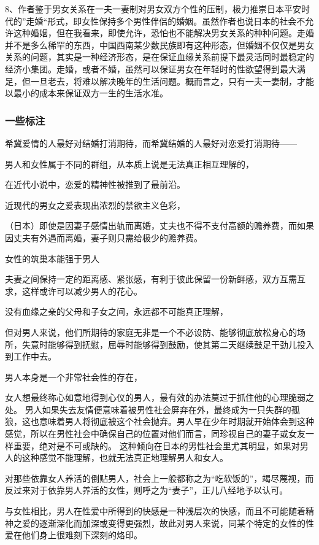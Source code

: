 8、作者鉴于男女关系在一夫一妻制对男女双方个性的压制，极力推崇日本平安时代的”走婚“形式，即女性保持多个男性伴侣的婚姻。虽然作者也说日本的社会不允许这种婚姻，但在我看来，即使允许，恐怕也不能解决男女关系的种种问题。走婚并不是多么稀罕的东西，中国西南某少数民族即有这种形态，但婚姻不仅仅是男女关系的问题，其实是一种经济形态，是在保证血缘关系前提下最灵活同时最稳定的经济小集团。走婚，或者不婚，虽然可以保证男女在年轻时的性欲望得到最大满足，但一旦老去，将难以解决晚年的生活问题。概而言之，只有一夫一妻制，才能以最小的成本来保证双方一生的生活水准。

\subsubsection{一些标注}

希冀爱情的人最好对结婚打消期待，而希冀结婚的人最好对恋爱打消期待——

男人和女性属于不同的群组，从本质上说是无法真正相互理解的，

在近代小说中，恋爱的精神性被推到了最前沿。

近现代的男女之爱表现出浓烈的禁欲主义色彩，

（日本）即使是因妻子感情出轨而离婚，丈夫也不得不支付高额的赡养费，而如果因丈夫有外遇而离婚，妻子则只需给极少的赡养费。

女性的筑巢本能强于男人

夫妻之间保持一定的距离感、紧张感，有利于彼此保留一份新鲜感，双方互需互求，这样或许可以减少男人的花心。

没有血缘之亲的父母和子女之间，永远都不可能真正理解，

但对男人来说，他们所期待的家庭无非是一个不必设防、能够彻底放松身心的场所，失意时能够得到抚慰，屈辱时能够得到鼓励，使其第二天继续鼓足干劲儿投入到工作中去。

男人本身是一个非常社会性的存在，

女人想最终称心如意地得到心仪的男人，最有效的办法莫过于抓住他的心理脆弱之处。
男人如果失去友情便意味着被男性社会屏弃在外，最终成为一只失群的孤狼，这也意味着男人将彻底被这个社会抛弃。男人早在少年时期就开始体会到这种感觉，所以在男性社会中确保自己的位置对他们而言，同珍视自己的妻子或女友一样重要，绝对是不可或缺的。 这种倾向在日本的男性社会里尤其明显，如果对男人的这种感觉不能理解，也就无法真正地理解男人和女人。

对那些依靠女人养活的倒贴男人，社会上一般都称之为“吃软饭的”，竭尽蔑视，而反过来对于依靠男人养活的女性，则呼之为“妻子”，正儿八经地予以认可。

与女性相比，男人在性爱中所得到的快感是一种浅层次的快感，而且不可能随着精神之爱的逐渐深化而加深或变得更强烈，故此对男人来说，同某个特定的女性的性爱在他们身上很难刻下深刻的烙印。
